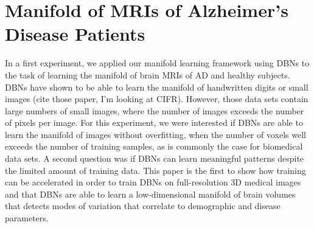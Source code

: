 



\section[Manifold of MRIs of Alzheimer's disease patients]{Manifold of MRIs of
Alzheimer's Disease Patients}


In a first experiment, we applied our manifold learning framework using DBNs to
the task of learning the manifold of brain MRIs of AD and healthy subjects. DBNs
have shown to be able to learn the manifold of handwritten digits or small
images (cite those paper, I'm looking at CIFR). However, those data sets contain
large numbers of small images, where the number of images exceeds the number of
pixels per image. For this experiment, we were interested if DBNs are able to
learn the manifold of images without overfitting, when the number of voxels well
exceeds the number of training samples, as is commonly the case for biomedical
data sets. A second question was if DBNs can learn meaningful patterns
despite the limited amount of training data. This paper is the first to show how
training can be accelerated in order to train DBNs on full-resolution 3D medical
images and that DBNs are able to learn a low-dimensional manifold of brain
volumes that detects modes of variation that correlate to demographic and
disease parameters.

